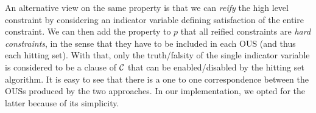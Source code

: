 An alternative view on the same property is that we can \emph{reify} the high level constraint by considering an indicator variable defining satisfaction of the entire constraint. 
We can then add the property to $p$ that all reified constraints are \emph{hard constraints}, in the sense that they have to be included in each OUS (and thus each hitting set). With that, only the truth/falsity of the single indicator variable is considered to be a clause of $\mathcal{C} $ that can be enabled/disabled by the hitting set algorithm. 
It is easy to see that there is a one to one correspondence between the OUSs produced by the two approaches. In our implementation, we opted for the latter because of its simplicity. 


